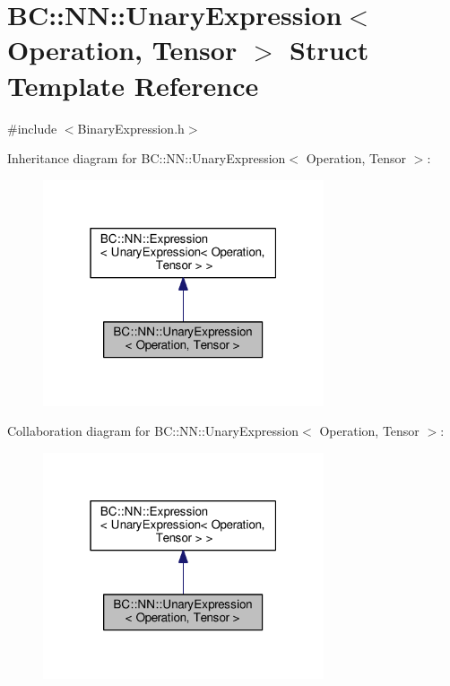 \hypertarget{structBC_1_1NN_1_1UnaryExpression}{}\section{BC\+:\+:NN\+:\+:Unary\+Expression$<$ Operation, Tensor $>$ Struct Template Reference}
\label{structBC_1_1NN_1_1UnaryExpression}


{\ttfamily \#include $<$Binary\+Expression.\+h$>$}



Inheritance diagram for BC\+:\+:NN\+:\+:Unary\+Expression$<$ Operation, Tensor $>$\+:
\nopagebreak
\begin{figure}[H]
\begin{center}
\leavevmode
\includegraphics[width=235pt]{structBC_1_1NN_1_1UnaryExpression__inherit__graph}
\end{center}
\end{figure}


Collaboration diagram for BC\+:\+:NN\+:\+:Unary\+Expression$<$ Operation, Tensor $>$\+:
\nopagebreak
\begin{figure}[H]
\begin{center}
\leavevmode
\includegraphics[width=235pt]{structBC_1_1NN_1_1UnaryExpression__coll__graph}
\end{center}
\end{figure}
